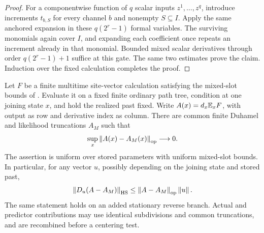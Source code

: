 \begin{proof}
For a componentwise function of $q$ scalar inputs $z^1,\ldots,z^q$,
introduce increments $t_{b,S}$ for every channel $b$ and nonempty
$S\subseteq I$.  Apply the same anchored expansion in these
$q(2^r-1)$ formal variables.  The surviving monomials again cover
$I$, and expanding each coefficient once repeats an increment already
in that monomial.  Bounded mixed scalar derivatives through order
$q(2^r-1)+1$ suffice at this gate.  The same two estimates prove the
claim.  Induction over the fixed calculation completes the proof.
\end{proof}

\begin{lemma}
\label{lem:path-conditional-derivative}
Let $F$ be a finite multitime site-vector calculation satisfying the
mixed-slot bounds of .  Evaluate it on a
fixed finite ordinary path tree, condition at one joining state $x$,
and hold the realized past fixed.  Write
$A(x)=d_x\mathbb E_xF$, with output as row and derivative index as column.
There are common finite Duhamel and likelihood truncations $A_M$ such
that
\begin{equation}
 \sup_x\left\lVert A(x)-A_M(x)\right\rVert_{\mathrm{op}}\longrightarrow0.
 \label{eq:path-conditional-op}
\end{equation}
The assertion is uniform over stored parameters with uniform mixed-slot
bounds.  In particular, for any vector $u$, possibly depending on the
joining state and stored past,
\begin{equation}
 \left\lVert D_u(A-A_M)\right\rVert_{\mathrm{HS}}
 \le\left\lVert A-A_M\right\rVert_{\mathrm{op}}\left\lVert u\right\rVert.
 \label{eq:path-row-weighted-error}
\end{equation}
The same statement holds on an added stationary reverse branch.
Actual and predictor contributions may use identical subdivisions and
common truncations, and are recombined before a centering test.
\end{lemma}

